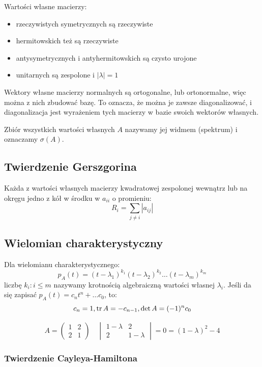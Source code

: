 \documentclass{../notatki}
\begin{document}
Wartości własne macierzy:
\begin{itemize}
  \item rzeczywistych symetrycznych są rzeczywiste
  \item hermitowskich też są rzeczywiste
  \item antysymetrycznych i antyhermitowskich są czysto urojone
  \item unitarnych są zespolone i $|\lambda| = 1$
\end{itemize}

Wektory własne macierzy normalnych są ortogonalne, lub ortonormalne, więc
można z nich zbudować bazę. To oznacza, że można je zawsze diagonalizować,
i diagonalizacja jest wyrażeniem tych macierzy w bazie swoich wektorów własnych.

Zbiór wszystkich wartości własnych $A$ nazywamy jej widmem (spektrum) i
oznaczamy $\sigma(A)$.

\subsection{Twierdzenie Gerszgorina}

Każda z wartości własnych macierzy kwadratowej zespolonej wewnątrz lub na
okręgu jedno z kół w środku w $a_{ii}$ o promieniu:
$$
R_i = \sum_{j \neq i} |a_{ij}|
$$

\subsection{Wielomian charakterystyczny}

Dla wielomianu charakterystycznego:
$$
p_A(t) = (t - \lambda_1)^{k_1} (t - \lambda_2)^{k_2} \dots (t - \lambda_m)^{k_m}
$$
liczbę $k_i : i \leq m$ nazywamy krotnością algebraiczną wartości
własnej $\lambda_i$. Jeśli da się zapisać $p_A(t) = c_nt^n + \dots c_0$, to:
$$
c_n = 1, \tr A = - c_{n - 1}, \determinant A = (-1)^n c_0
$$

\begin{examplebox}
  $$
  A =
  \begin{pmatrix}
    1 & 2 \\
    2 & 1
  \end{pmatrix} \quad
  \begin{vmatrix}
    1 - \lambda & 2 \\
    2 & 1 - \lambda
  \end{vmatrix} = 0 = (1 - \lambda)^2 - 4
  $$
\end{examplebox}

\subsubsection{Twierdzenie Cayleya-Hamiltona}
\end{document}
